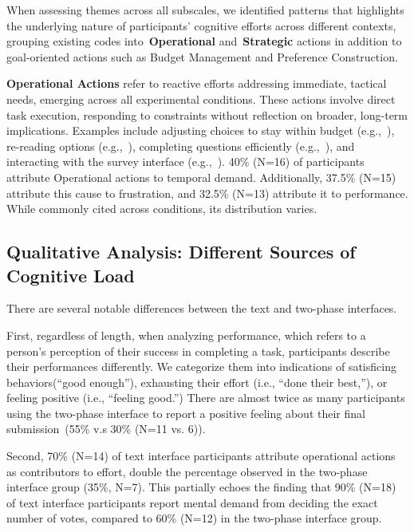 When assessing themes across all subscales, we identified patterns that highlights the underlying nature of participants' cognitive efforts across different contexts, grouping existing codes into~\textbf{Operational} and~\textbf{Strategic} actions in addition to goal-oriented actions such as Budget Management and Preference Construction.

\textbf{Operational Actions} refer to reactive efforts addressing immediate, tactical needs, emerging across all experimental conditions. These actions involve direct task execution, responding to constraints without reflection on broader, long-term implications. Examples include adjusting choices to stay within budget (e.g.,~), re-reading options (e.g.,~), completing questions efficiently (e.g.,~), and interacting with the survey interface (e.g.,~). 40\% (N=16) of participants attribute Operational actions to temporal demand. Additionally, 37.5\% (N=15) attribute this cause to frustration, and 32.5\% (N=13) attribute it to performance. While commonly cited across conditions, its distribution varies.

\subsection{Qualitative Analysis: Different Sources of Cognitive Load}
\label{sec:cog_diff}
There are several notable differences between the text and two-phase interfaces. 

First, regardless of length, when analyzing performance, which refers to a person's perception of their success in completing a task, participants describe their performances differently. We categorize them into indications of satisficing behaviors(``good enough''), exhausting their effort (i.e., ``done their best,''), or feeling positive (i.e., ``feeling good.'') There are almost twice as many participants using the two-phase interface to report a positive feeling about their final submission~(55\% v.s 30\% (N=11 vs. 6)).

Second, 70\% (N=14) of text interface participants attribute operational actions as contributors to effort, double the percentage observed in the two-phase interface group (35\%, N=7). This partially echoes the finding that 90\% (N=18) of text interface participants report mental demand from deciding the exact number of votes, compared to 60\% (N=12) in the two-phase interface group.

